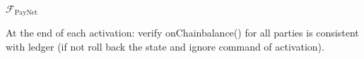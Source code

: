 \begin{functionality}{$\mathcal{F}_{\mathrm{PayNet}}$}
\begin{algorithmic}[1]
    \State At the end of each activation: 
    \Indent
    \State verify  onChainbalance() for all parties is consistent with ledger (if not roll back the state and ignore command of activation).
    \EndIndent
  \end{algorithmic}
\end{functionality}
